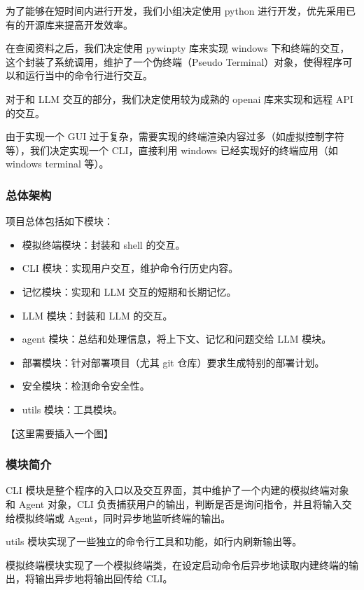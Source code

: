 \documentclass{article}
\theoremstyle{plain}
\theoremstyle{definition}
\theoremstyle{remark}
\begin{document}
为了能够在短时间内进行开发，我们小组决定使用 python 进行开发，优先采用已有的开源库来提高开发效率。

在查阅资料之后，我们决定使用 pywinpty 库来实现 windows 下和终端的交互，这个封装了系统调用，维护了一个伪终端（Pseudo Terminal）对象，使得程序可以和运行当中的命令行进行交互。

对于和 LLM 交互的部分，我们决定使用较为成熟的 openai 库来实现和远程 API 的交互。

由于实现一个 GUI 过于复杂，需要实现的终端渲染内容过多（如虚拟控制字符等），我们决定实现一个 CLI，直接利用 windows 已经实现好的终端应用（如 windows terminal 等）。

\subsubsection{总体架构}

项目总体包括如下模块：

\begin{itemize}
    \setlength{\itemsep}{0.1em}
    \setlength{\parskip}{0.1em}
    \item 模拟终端模块：封装和 shell 的交互。
    \item CLI 模块：实现用户交互，维护命令行历史内容。
    \item 记忆模块：实现和 LLM 交互的短期和长期记忆。
    \item LLM 模块：封装和 LLM 的交互。
    \item agent 模块：总结和处理信息，将上下文、记忆和问题交给 LLM 模块。
    \item 部署模块：针对部署项目（尤其 git 仓库）要求生成特别的部署计划。
    \item 安全模块：检测命令安全性。
    \item utils 模块：工具模块。
\end{itemize}

【这里需要插入一个图】

\subsubsection{模块简介}

CLI 模块是整个程序的入口以及交互界面，其中维护了一个内建的模拟终端对象和 Agent 对象，CLI 负责捕获用户的输出，判断是否是询问指令，并且将输入交给模拟终端或 Agent，同时异步地监听终端的输出。

utils 模块实现了一些独立的命令行工具和功能，如行内刷新输出等。

模拟终端模块实现了一个模拟终端类，在设定启动命令后异步地读取内建终端的输出，将输出异步地将输出回传给 CLI。
\end{document}

